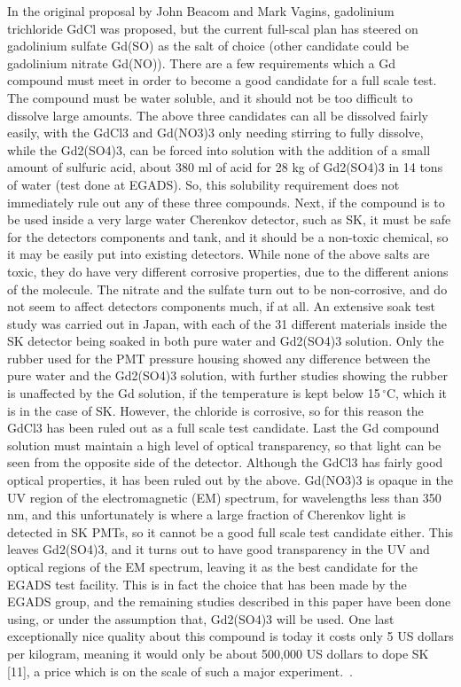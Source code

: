 In the original proposal by John Beacom and Mark Vagins, gadolinium trichloride GdCl was proposed, %
but the current full-scal plan has steered on gadolinium sulfate Gd(SO) %
as the salt of choice (other candidate could be gadolinium nitrate Gd(NO)).
There are a few requirements which a Gd compound must meet in order to become a good candidate for a full scale test.
The compound must be water soluble, and it should not be too difficult to dissolve large amounts.
The above three candidates can all be dissolved fairly easily, with the GdCl3 and Gd(NO3)3 only
needing stirring to fully dissolve, while the Gd2(SO4)3, can be forced into solution with the addition of %
a small amount of sulfuric acid, about 380 ml of acid for 28 kg of Gd2(SO4)3 in 14 tons of water (test done at EGADS).
So, this solubility requirement does not immediately rule out any of these three compounds.
Next, if the compound is to be used inside a very large water Cherenkov detector, such as SK, it must be safe for
the detectors components and tank, and it should be a non-toxic chemical, so it may be easily put into existing detectors.
While none of the above salts are toxic, they do have very different corrosive properties, due to the different anions of the molecule.
The nitrate and the sulfate turn out to be non-corrosive, and do not seem to affect detectors components much, if at all.
An extensive soak test study was carried out in Japan, with each of the 31 different materials inside the SK detector %
being soaked in both pure water and Gd2(SO4)3 solution.
Only the rubber used for the PMT pressure housing showed any difference between the pure water and the Gd2(SO4)3 solution, %
with further studies showing the rubber is unaffected by the Gd solution, if the temperature is kept below 15\,${}^\circ$C, %
which it is in the case of SK.
However, the chloride is corrosive, so for this reason the GdCl3 has been ruled out as a full scale test candidate.
Last the Gd compound solution must maintain a high level of optical transparency, %
so that light can be seen from the opposite side of the detector.
Although the GdCl3 has fairly good optical properties, it has been ruled out by the above.
Gd(NO3)3 is opaque in the UV region of the electromagnetic (EM) spectrum, for wavelengths less than 350\,nm, %
and this unfortunately is where a large fraction of Cherenkov light is detected in SK PMTs, %
so it cannot be a good full scale test candidate either.
This leaves Gd2(SO4)3, and it turns out to have good transparency in the UV and optical regions of the EM spectrum, %
leaving it as the best candidate for the EGADS test facility.
This is in fact the choice that has been made by the EGADS group, and the remaining studies described in this paper %
have been done using, or under the assumption that, Gd2(SO4)3 will be used.
One last exceptionally nice quality about this compound is today it costs only 5 US dollars per kilogram, %
meaning it would only be about 500,000 US dollars to dope SK [11], a price which is on the scale of such a major experiment.~\cite{1201.1017}.

